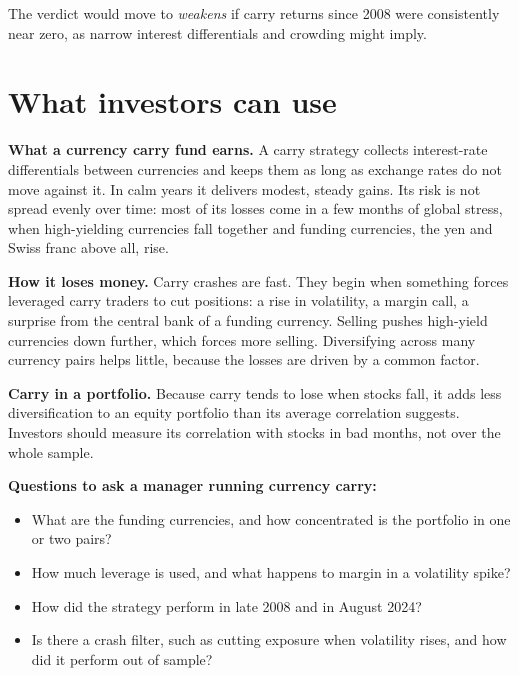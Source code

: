 The verdict would move to \emph{weakens} if carry returns since 2008 were consistently near zero, as narrow interest differentials and crowding might imply.

\section{What investors can use}
\label{sec:18-investors}

\textbf{What a currency carry fund earns.} A carry strategy collects interest-rate differentials between currencies and keeps them as long as exchange rates do not move against it. In calm years it delivers modest, steady gains. Its risk is not spread evenly over time: most of its losses come in a few months of global stress, when high-yielding currencies fall together and funding currencies, the yen and Swiss franc above all, rise.

\textbf{How it loses money.} Carry crashes are fast. They begin when something forces leveraged carry traders to cut positions: a rise in volatility, a margin call, a surprise from the central bank of a funding currency. Selling pushes high-yield currencies down further, which forces more selling. Diversifying across many currency pairs helps little, because the losses are driven by a common factor.

\textbf{Carry in a portfolio.} Because carry tends to lose when stocks fall, it adds less diversification to an equity portfolio than its average correlation suggests. Investors should measure its correlation with stocks in bad months, not over the whole sample.

\textbf{Questions to ask a manager running currency carry:}

\begin{itemize}
  \item What are the funding currencies, and how concentrated is the portfolio in one or two pairs?
  \item How much leverage is used, and what happens to margin in a volatility spike?
  \item How did the strategy perform in late 2008 and in August 2024?
  \item Is there a crash filter, such as cutting exposure when volatility rises, and how did it perform out of sample?
\end{itemize}

